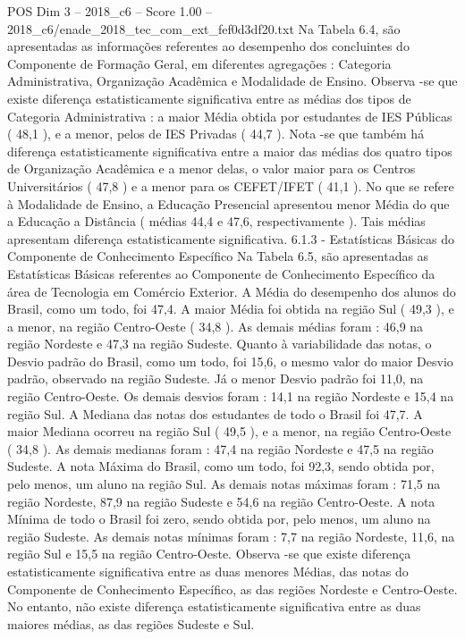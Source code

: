 \begin{textsample}{POS Dim 3 – 2018\_c6 – Score 1.00 – 2018\_c6/enade\_2018\_tec\_com\_ext\_fef0d3df20.txt}
Na Tabela 6.4, são apresentadas as informações referentes ao desempenho dos concluintes do Componente de Formação Geral, em diferentes agregações : Categoria Administrativa, Organização Acadêmica e Modalidade de Ensino.
Observa -se que existe diferença estatisticamente significativa entre as médias dos tipos de Categoria Administrativa : a maior Média obtida por estudantes de IES Públicas ( 48,1 ), e a menor, pelos de IES Privadas ( 44,7 ).
Nota -se que também há diferença estatisticamente significativa entre a maior das médias dos quatro tipos de Organização Acadêmica e a menor delas, o valor maior para os Centros Universitários ( 47,8 ) e a menor para os CEFET/IFET ( 41,1 ).
No que se refere à Modalidade de Ensino, a Educação Presencial apresentou menor Média do que a Educação a Distância ( médias 44,4 e 47,6, respectivamente ).
Tais médias apresentam diferença estatisticamente significativa. 6.1.3 - Estatísticas Básicas do Componente de Conhecimento Específico Na Tabela 6.5, são apresentadas as Estatísticas Básicas referentes ao Componente de Conhecimento Específico da área de Tecnologia em Comércio Exterior.
A Média do desempenho dos alunos do Brasil, como um todo, foi 47,4.
A maior Média foi obtida na região Sul ( 49,3 ), e a menor, na região Centro-Oeste ( 34,8 ).
As demais médias foram : 46,9 na região Nordeste e 47,3 na região Sudeste.
Quanto à variabilidade das notas, o Desvio padrão do Brasil, como um todo, foi 15,6, o mesmo valor do maior Desvio padrão, observado na região Sudeste.
Já o menor Desvio padrão foi 11,0, na região Centro-Oeste.
Os demais desvios foram : 14,1 na região Nordeste e 15,4 na região Sul.
A Mediana das notas dos estudantes de todo o Brasil foi 47,7.
A maior Mediana ocorreu na região Sul ( 49,5 ), e a menor, na região Centro-Oeste ( 34,8 ).
As demais medianas foram : 47,4 na região Nordeste e 47,5 na região Sudeste.
A nota Máxima do Brasil, como um todo, foi 92,3, sendo obtida por, pelo menos, um aluno na região Sul.
As demais notas máximas foram : 71,5 na região Nordeste, 87,9 na região Sudeste e 54,6 na região Centro-Oeste.
A nota Mínima de todo o Brasil foi zero, sendo obtida por, pelo menos, um aluno na região Sudeste.
As demais notas mínimas foram : 7,7 na região Nordeste, 11,6, na região Sul e 15,5 na região Centro-Oeste.
Observa -se que existe diferença estatisticamente significativa entre as duas menores Médias, das notas do Componente de Conhecimento Específico, as das regiões Nordeste e Centro-Oeste.
No entanto, não existe diferença estatisticamente significativa entre as duas maiores médias, as das regiões Sudeste e Sul.

\end{textsample}
